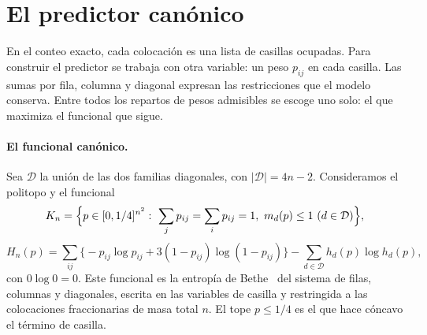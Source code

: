 \section{El predictor canónico}\label{sec:predictor}

En el conteo exacto, cada colocación es una lista de casillas ocupadas. Para construir
el predictor se trabaja con otra variable: un peso $p_{ij}$ en cada casilla. Las sumas por
fila, columna y diagonal expresan las restricciones que el modelo conserva. Entre todos los
repartos de pesos admisibles se escoge uno solo: el que maximiza el funcional que sigue.

\paragraph{El funcional canónico.}
Sea $\mathcal D$ la unión de las dos familias diagonales, con $|\mathcal D|=4n-2$. Consideramos el
politopo y el funcional
\begin{equation}\label{eq:Kn}
 K_n=\Bigl\{p\in[0,1/4]^{n^2}:\ \sum_jp_{ij}=\sum_ip_{ij}=1,\ m_d(p)\le1\ (d\in\mathcal D)\Bigr\},
\end{equation}
\begin{equation}\label{eq:Hn}
 H_n(p)=\sum_{ij}\bigl\{-p_{ij}\log p_{ij}+3(1-p_{ij})\log(1-p_{ij})\bigr\}-\sum_{d\in\mathcal D}h_d(p)\log
h_d(p),
\end{equation}
con $0\log0=0$. Este funcional es la entropía de Bethe~\cite{YFW} del sistema de filas, columnas y
diagonales, escrita en las variables de casilla y restringida a las colocaciones fraccionarias de
masa total $n$.
El tope $p\le1/4$ es el que hace cóncavo el término de casilla.

